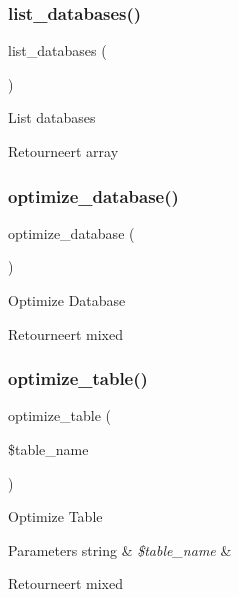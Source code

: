 \subsubsection{\texorpdfstring{list\_databases()}{list\_databases()}}
{\footnotesize\ttfamily list\+\_\+databases (\begin{DoxyParamCaption}{ }\end{DoxyParamCaption})}

List databases

\begin{DoxyReturn}{Retourneert}
array 
\end{DoxyReturn}
\mbox{\label{class_c_i___d_b__utility_acb26598e177f525b39978f6dfca1f212}} 
\subsubsection{\texorpdfstring{optimize\_database()}{optimize\_database()}}
{\footnotesize\ttfamily optimize\+\_\+database (\begin{DoxyParamCaption}{ }\end{DoxyParamCaption})}

Optimize Database

\begin{DoxyReturn}{Retourneert}
mixed 
\end{DoxyReturn}
\mbox{\label{class_c_i___d_b__utility_a6aed9274f43b64eeee607d172b51529d}} 
\subsubsection{\texorpdfstring{optimize\_table()}{optimize\_table()}}
{\footnotesize\ttfamily optimize\+\_\+table (\begin{DoxyParamCaption}\item[{}]{\$table\+\_\+name }\end{DoxyParamCaption})}

Optimize Table


\begin{DoxyParams}[1]{Parameters}
string & {\em \$table\+\_\+name} & \\
\hline
\end{DoxyParams}
\begin{DoxyReturn}{Retourneert}
mixed 
\end{DoxyReturn}
\mbox{\label{class_c_i___d_b__utility_a41a627004d26198c69bf466eef7eaeeb}} 

